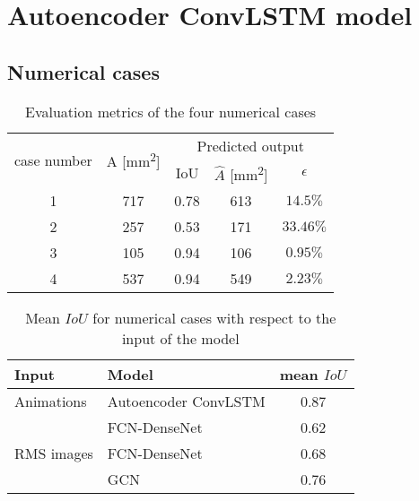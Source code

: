 \section{Autoencoder ConvLSTM model}
\label{sec53}

\subsection{Numerical cases}
\label{sec531}

\begin{table}[!ht]
	\centering
	\caption{Evaluation metrics of the four numerical cases}
	\begin{tabular}{ccccc}
		\toprule
		\multirow{2}{*}{case number} & \multicolumn{1}{c}{\multirow{2}{*}{A [mm\textsuperscript{2}]}} & \multicolumn{3}{c}{Predicted output} \\ 
		\cmidrule(lr){3-5} & & \multicolumn{1}{c}{IoU} & \multicolumn{1}{c}{\(\hat{A}\) [mm\textsuperscript{2}]} & \(\epsilon\) \\
		\midrule
		1 & 717 & \multicolumn{1}{c}{0.78} & \multicolumn{1}{c}{613} & \(14.5\%\) \\ 
		2 & 257 & \multicolumn{1}{c}{0.53} & \multicolumn{1}{c}{171} & \(33.46\%\) \\ 
		3 & 105 & \multicolumn{1}{c}{0.94} & \multicolumn{1}{c}{106} & \(0.95\%\) \\ 
		4 & 537 & \multicolumn{1}{c}{0.94} & \multicolumn{1}{c}{549} & \(2.23\%\) \\ 
		\bottomrule
	\end{tabular}	
	\label{tab:num_cases}
\end{table}
\begin{table}[!ht]
	\centering
	\caption{Mean \(IoU\) for numerical cases with respect to the input of the model}
	\begin{tabular}{llc}
		\toprule
		Input & Model & mean \(IoU\) \\ 
		\midrule
		Animations & Autoencoder ConvLSTM & 0.87 \\ 
		\midrule
		\multirow{3}{*}{RMS images}  
		& FCN-DenseNet~\cite{Ijjeh2021} & 0.62   \\
		& FCN-DenseNet~\cite{Ijjeh2022} & 0.68   \\
		& GCN~\cite{Ijjeh2022}          & 0.76   \\ 
		\bottomrule
	\end{tabular}
	\label{tab:meanIoU_vs_input}
\end{table}
